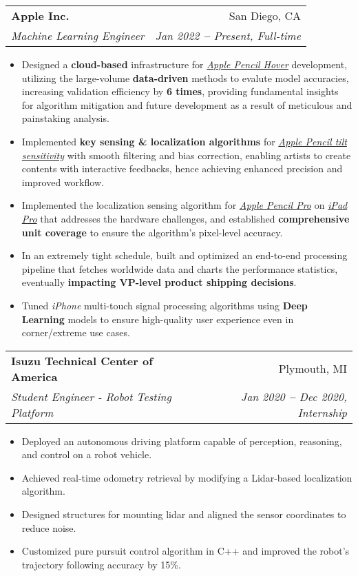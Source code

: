 \documentclass[letterpaper,11pt]{article}
\makeatletter
\newcommand{\resumeItem}[1]{
  \item\small{
    {#1 \vspace{-2pt}}
  }
}
\newcommand{\resumeSubheading}[4]{
  \vspace{-2pt}\item
    \begin{tabular*}{0.97\textwidth}[t]{l@{\extracolsep{\fill}}r}
      \textbf{#1} & #2 \\
      \textit{\small#3} & \textit{\small #4} \\
    \end{tabular*}\vspace{-7pt}
}
\newcommand{\resumeItemListStart}{\begin{itemize}}
\newcommand{\resumeItemListEnd}{\end{itemize}\vspace{-5pt}}
\makeatother
\begin{document}
    \resumeSubheading
      {Apple Inc.}{San Diego, CA}
      {Machine Learning Engineer}{Jan 2022 \textbf{--} Present, Full-time}
        \resumeItemListStart
            \resumeItem{Designed a \textbf{cloud-based} infrastructure for \href{https://developer.apple.com/news/?id=23ksaoks}{\textit{Apple Pencil Hover}} development, utilizing the large-volume \textbf{data-driven} methods to evalute model accuracies, increasing validation efficiency by \textbf{6 times}, providing fundamental insights for algorithm mitigation and future development as a result of meticulous and painstaking analysis.}
            \resumeItem{Implemented \textbf{key sensing \& localization algorithms} for \href{https://www.apple.com/apple-pencil/}{\textit{Apple Pencil tilt sensitivity}} with smooth filtering and bias correction, enabling artists to create contents with interactive feedbacks, hence achieving enhanced precision and improved workflow.}
            \resumeItem{Implemented the localization sensing algorithm for \href{https://www.apple.com/apple-pencil/}{\textit{Apple Pencil Pro}} on \href{https://www.apple.com/ipad-pro/}{\textit{iPad Pro}} that addresses the hardware challenges, and established \textbf{comprehensive unit coverage} to ensure the algorithm’s pixel-level accuracy.}
            \resumeItem{In an extremely tight schedule, built and optimized an end-to-end processing pipeline that fetches worldwide data and charts the performance statistics, eventually \textbf{impacting VP-level product shipping decisions}.}
            \resumeItem{Tuned \textit{iPhone} multi-touch signal processing algorithms using \textbf{Deep Learning} models to ensure high-quality user experience even in corner/extreme use cases.}
            \resumeItemListEnd

    \resumeSubheading
      {Isuzu Technical Center of America}{Plymouth, MI}
      {Student Engineer - Robot Testing Platform}{Jan 2020 \textbf{--} Dec 2020, Internship}
        \resumeItemListStart
            \resumeItem{Deployed an autonomous driving platform capable of perception, reasoning, and control on a robot vehicle.}
            \resumeItem{Achieved real-time odometry retrieval by modifying a Lidar-based localization algorithm.}
            \resumeItem{Designed structures for mounting lidar and aligned the sensor coordinates to reduce noise.}
            \resumeItem{Customized pure pursuit control algorithm in C++ and improved the robot’s trajectory following accuracy by 15\%.}
        \resumeItemListEnd
\end{document}
